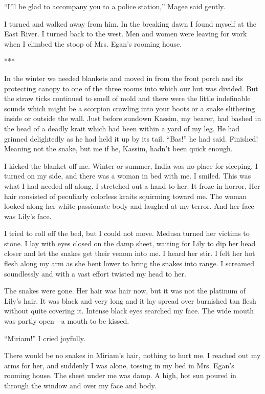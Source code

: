 \documentclass{novel}
\begin{document}
{“I’ll be glad to accompany you to a police station,” Magee said gently.

I turned and walked away from him. In the breaking dawn I found myself at the East River. I turned back to the west. Men and women were leaving for work when I climbed the stoop of Mrs. Egan’s rooming house.

***

In the winter we needed blankets and moved in from the front porch and its protecting canopy to one of the three rooms into which our hut was divided. But the straw ticks continued to smell of mold and there were the little indefinable sounds which might be a scorpion crawling into your boots or a snake slithering inside or outside the wall. Just before sundown Kassim, my bearer, had bashed in the head of a deadly krait which had been within a yard of my leg. He had grinned delightedly as he had held it up by its tail. “Bas!” he had said. Finished! Meaning not the snake, but me if he, Kassim, hadn’t been quick enough.

I kicked the blanket off me. Winter or summer, India was no place for sleeping. I turned on my side, and there was a woman in bed with me. I smiled. This was what I had needed all along. I stretched out a hand to her. It froze in horror. Her hair consisted of peculiarly colorless kraits squirming toward me. The woman looked along her white passionate body and laughed at my terror. And her face was Lily’s face.

I tried to roll off the bed, but I could not move. Medusa turned her victims to stone. I lay with eyes closed on the damp sheet, waiting for Lily to dip her head closer and let the snakes get their venom into me. I heard her stir. I felt her hot flesh along my arm as she bent lower to bring the snakes into range. I screamed soundlessly and with a vast effort twisted my head to her.

The snakes were gone. Her hair was hair now, but it was not the platinum of Lily’s hair. It was black and very long and it lay spread over burnished tan flesh without quite covering it. Intense black eyes searched my face. The wide mouth was partly open—a mouth to be kissed.

“Miriam!” I cried joyfully.

There would be no snakes in Miriam’s hair, nothing to hurt me. I reached out my arms for her, and suddenly I was alone, tossing in my bed in Mrs. Egan’s rooming house. The sheet under me was damp. A high, hot sun poured in through the window and over my face and body.

}
\end{document}
